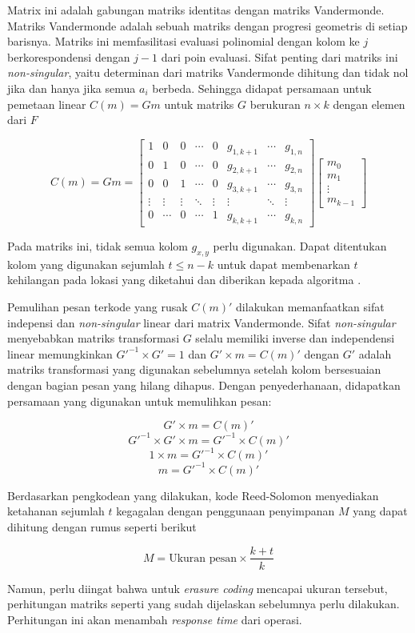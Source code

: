 Matrix ini adalah gabungan matriks identitas dengan matriks Vandermonde. Matriks Vandermonde adalah sebuah matriks dengan progresi geometris di setiap barisnya. Matriks ini memfasilitasi evaluasi polinomial dengan kolom ke $j$ berkorespondensi dengan $j - 1$ dari poin evaluasi. Sifat penting dari matriks ini \textit{non-singular}, yaitu determinan dari matriks Vandermonde dihitung dan tidak nol jika dan hanya jika semua $a_i$ berbeda. Sehingga didapat persamaan untuk pemetaan linear $C(m) = Gm$ untuk matriks $G$ berukuran ${n} \times {k}$ dengan elemen dari $F$

\[
    C(m) = Gm = 
    \begin{bmatrix}
        1 & 0 & 0 & \cdots & 0 & g_{1,k+1} & \cdots & g_{1,n} \\
        0 & 1 & 0 & \cdots & 0 & g_{2,k+1} & \cdots & g_{2,n} \\
        0 & 0 & 1 & \cdots & 0 & g_{3,k+1} & \cdots & g_{3,n} \\
        \vdots & \vdots & \vdots & \ddots & \vdots & \vdots & \ddots & \vdots \\
        0 & \cdots & 0 & \cdots & 1 & g_{k,k+1} & \cdots & g_{k,n}
    \end{bmatrix}
    \begin{bmatrix}
        m_0 \\
        m_1 \\
        \vdots \\
        m_{k-1}
    \end{bmatrix}
\]

Pada matriks ini, tidak semua kolom $g_{x,y}$ perlu digunakan. Dapat ditentukan kolom yang digunakan sejumlah $t \le n - k$ untuk dapat membenarkan $t$ kehilangan pada lokasi yang diketahui dan diberikan kepada algoritma \parencite{riley2001introduction}.

Pemulihan pesan terkode yang rusak $C(m)'$ dilakukan memanfaatkan sifat indepensi dan \textit{non-singular} linear dari matrix Vandermonde. Sifat \textit{non-singular} menyebabkan matriks transformasi $G$ selalu memiliki inverse dan independensi linear memungkinkan $G'^{-1} \times G' = 1$ dan $G' \times m = C(m)'$ dengan $G'$ adalah matriks transformasi yang digunakan sebelumnya setelah kolom bersesuaian dengan bagian pesan yang hilang dihapus. Dengan penyederhanaan, didapatkan persamaan yang digunakan untuk memulihkan pesan:

\[G' \times m = C(m)'\]
\[G'^{-1} \times G' \times m = G'^{-1} \times C(m)'\]
\[1 \times m = G'^{-1} \times C(m)'\]
\[m = G'^{-1} \times C(m)'\]

Berdasarkan pengkodean yang dilakukan, kode Reed-Solomon menyediakan ketahanan sejumlah $t$ kegagalan dengan penggunaan penyimpanan $M$ yang dapat dihitung dengan rumus seperti berikut

\[M = \text{Ukuran pesan} \times \frac{k + t}{k}\]

Namun, perlu diingat bahwa untuk \textit{erasure coding} mencapai ukuran tersebut, perhitungan matriks seperti yang sudah dijelaskan sebelumnya perlu dilakukan. Perhitungan ini akan menambah \textit{response time} dari operasi.
